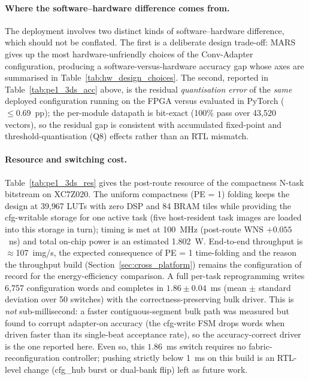 \documentclass[12pt, a4paper]{report}
\numberwithin{equation}{chapter}
\numberwithin{figure}{chapter}
\numberwithin{table}{chapter}
\numberwithin{algorithm}{chapter}
\begin{document}
\paragraph{Where the software--hardware difference comes from.}
The deployment involves two distinct kinds of software--hardware difference, which should not be conflated. The first is a deliberate design trade-off: MARS gives up the most hardware-unfriendly choices of the Conv-Adapter~\cite{Chen2024ConvAdapter} configuration, producing a software-versus-hardware accuracy gap whose axes are summarised in Table~\ref{tab:hw_design_choices}. The second, reported in Table~\ref{tab:pe1_3ds_acc} above, is the residual \emph{quantisation error} of the \emph{same} deployed configuration running on the FPGA versus evaluated in PyTorch ($\leq 0.69$~pp); the per-module datapath is bit-exact (100\% pass over 43{,}520 vectors), so the residual gap is consistent with accumulated fixed-point and threshold-quantisation (Q8) effects rather than an RTL mismatch.

\paragraph{Resource and switching cost.}
Table~\ref{tab:pe1_3ds_res} gives the post-route resource of the compactness N-task bitstream on XC7Z020. The uniform compactness (PE = 1) folding keeps the design at 39{,}967 LUTs with zero DSP and 84 BRAM tiles while providing the cfg-writable storage for one active task (five host-resident task images are loaded into this storage in turn); timing is met at 100~MHz (post-route WNS $+0.055$~ns) and total on-chip power is an estimated 1.802~W. End-to-end throughput is $\approx$107~img/s, the expected consequence of PE = 1 time-folding and the reason the throughput build (Section~\ref{sec:cross_platform}) remains the configuration of record for the energy-efficiency comparison. A full per-task reprogramming writes 6{,}757 configuration words and completes in $1.86 \pm 0.04$~ms (mean $\pm$ standard deviation over 50 switches) with the correctness-preserving bulk driver. This is \emph{not} sub-millisecond: a faster contiguous-segment bulk path was measured but found to corrupt adapter-on accuracy (the cfg-write FSM drops words when driven faster than its single-beat acceptance rate), so the accuracy-correct driver is the one reported here. Even so, this $1.86$~ms switch requires no fabric-reconfiguration controller; pushing strictly below 1~ms on this build is an RTL-level change (cfg\_hub burst or dual-bank flip) left as future work.
\end{document}
